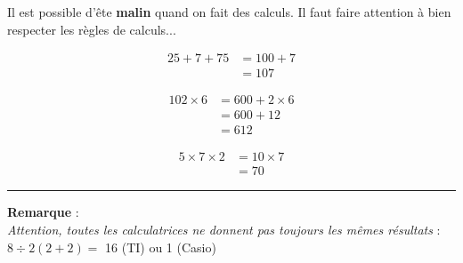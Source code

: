 \documentclass[11pt]{article}
\newcommand{\horrule}[1]{\rule{\linewidth}{#1}} %
\begin{document}
Il est possible d'ête \textbf{malin} quand on fait des calculs. Il faut faire attention à bien respecter les règles de calculs...

\begin{minipage}[t]{0.33\textwidth}
\begin{align*}
25 + 7 + 75 &= 100 + 7  \\
            &= 107
\end{align*}

\end{minipage}
\begin{minipage}[t]{0.33\textwidth}

\begin{align*}
102 \times 6 &= 600 + 2 \times 6 \\
             &= 600 + 12 \\
             &= 612
\end{align*}

\end{minipage}
\begin{minipage}[t]{0.33\textwidth}

\begin{align*}
5 \times 7 \times 2 &= 10 \times 7 \\
                    &= 70
\end{align*}
\end{minipage}

\vspace{0.5cm}\horrule{1px}\vspace{0.5cm}


\textbf{Remarque} : \\
\textit{Attention, toutes les calculatrices ne donnent pas toujours les mêmes résultats} : $8 \div 2(2+2) =$ 16 (TI) ou 1 (Casio)
\end{document}
